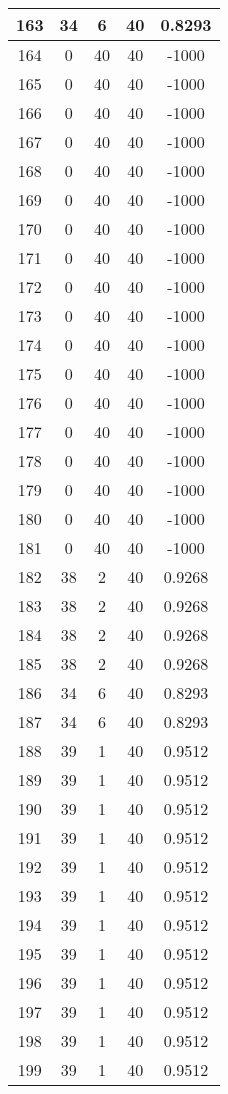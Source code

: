 \documentclass[letterpaper, 12pt]{article}
\begin{document}
\begin{longtable}{|c|c|c|c|c|}
\hline
163 & 34 & 6 & 40 & 0.8293 \\
\hline
164 & 0 & 40 & 40 & -1000 \\
\hline
165 & 0 & 40 & 40 & -1000 \\
\hline
166 & 0 & 40 & 40 & -1000 \\
\hline
167 & 0 & 40 & 40 & -1000 \\
\hline
168 & 0 & 40 & 40 & -1000 \\
\hline
169 & 0 & 40 & 40 & -1000 \\
\hline
170 & 0 & 40 & 40 & -1000 \\
\hline
171 & 0 & 40 & 40 & -1000 \\
\hline
172 & 0 & 40 & 40 & -1000 \\
\hline
173 & 0 & 40 & 40 & -1000 \\
\hline
174 & 0 & 40 & 40 & -1000 \\
\hline
175 & 0 & 40 & 40 & -1000 \\
\hline
176 & 0 & 40 & 40 & -1000 \\
\hline
177 & 0 & 40 & 40 & -1000 \\
\hline
178 & 0 & 40 & 40 & -1000 \\
\hline
179 & 0 & 40 & 40 & -1000 \\
\hline
180 & 0 & 40 & 40 & -1000 \\
\hline
181 & 0 & 40 & 40 & -1000 \\
\hline
182 & 38 & 2 & 40 & 0.9268 \\
\hline
183 & 38 & 2 & 40 & 0.9268 \\
\hline
184 & 38 & 2 & 40 & 0.9268 \\
\hline
185 & 38 & 2 & 40 & 0.9268 \\
\hline
186 & 34 & 6 & 40 & 0.8293 \\
\hline
187 & 34 & 6 & 40 & 0.8293 \\
\hline
188 & 39 & 1 & 40 & 0.9512 \\
\hline
189 & 39 & 1 & 40 & 0.9512 \\
\hline
190 & 39 & 1 & 40 & 0.9512 \\
\hline
191 & 39 & 1 & 40 & 0.9512 \\
\hline
192 & 39 & 1 & 40 & 0.9512 \\
\hline
193 & 39 & 1 & 40 & 0.9512 \\
\hline
194 & 39 & 1 & 40 & 0.9512 \\
\hline
195 & 39 & 1 & 40 & 0.9512 \\
\hline
196 & 39 & 1 & 40 & 0.9512 \\
\hline
197 & 39 & 1 & 40 & 0.9512 \\
\hline
198 & 39 & 1 & 40 & 0.9512 \\
\hline
199 & 39 & 1 & 40 & 0.9512 \\
\hline
\end{longtable}
\end{document}
